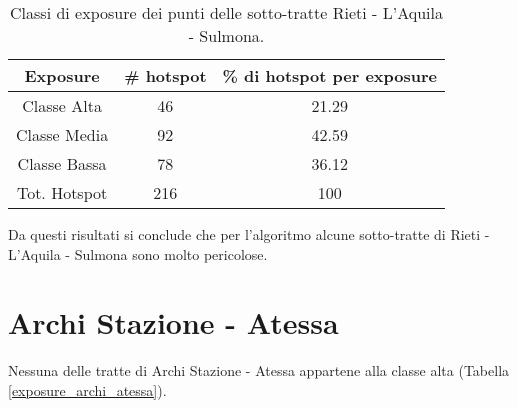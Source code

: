 \begin{table}[H]
	\centering
	\begin{tabular}{|c|c|c|}
		\hline
		\rowcolor[HTML]{C0C0C0} 
		\textbf{Exposure} & \textbf{\# hotspot} & \textbf{\% di hotspot per exposure} \\ \hline
		Classe Alta       & 46                  & 21.29                                   \\ \hline
		Classe Media      & 92                 & 42.59                         \\ \hline
		Classe Bassa      & 78              & 36.12                            \\ \hline
		Tot. Hotspot      & 216               & 100                                 \\ \hline
	\end{tabular}
	\caption{Classi di exposure dei punti delle sotto-tratte Rieti - L'Aquila - Sulmona.}
	\label{risultati_rieti_aquila_sulmona}
\end{table}

Da questi risultati si conclude che per l'algoritmo alcune sotto-tratte di Rieti - L'Aquila - Sulmona sono molto pericolose.

\section{Archi Stazione - Atessa}
Nessuna delle tratte di Archi Stazione - Atessa appartene alla classe alta (Tabella \ref{exposure_archi_atessa}).

